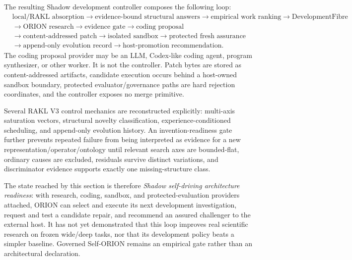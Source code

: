 The resulting Shadow development controller composes the following loop:
\[
\begin{aligned}
&\text{local/RAKL absorption}
\rightarrow \text{evidence-bound structural answers}
\rightarrow \text{empirical work ranking}
\rightarrow \text{DevelopmentFibre}\\
&\rightarrow \text{ORION research}
\rightarrow \text{evidence gate}
\rightarrow \text{coding proposal}\\
&\rightarrow \text{content-addressed patch}
\rightarrow \text{isolated sandbox}
\rightarrow \text{protected fresh assurance}\\
&\rightarrow \text{append-only evolution record}
\rightarrow \text{host-promotion recommendation}.
\end{aligned}
\]
The coding proposal provider may be an LLM, Codex-like coding agent, program synthesizer, or other worker.  It is not the controller.  Patch bytes are stored as content-addressed artifacts, candidate execution occurs behind a host-owned sandbox boundary, protected evaluator/governance paths are hard rejection coordinates, and the controller exposes no merge primitive.

Several RAKL V3 control mechanics are reconstructed explicitly: multi-axis saturation vectors, structural novelty classification, experience-conditioned scheduling, and append-only evolution history.  An invention-readiness gate further prevents repeated failure from being interpreted as evidence for a new representation/operator/ontology until relevant search axes are bounded-flat, ordinary causes are excluded, residuals survive distinct variations, and discriminator evidence supports exactly one missing-structure class.

The state reached by this section is therefore \emph{Shadow self-driving architecture readiness}: with research, coding, sandbox, and protected-evaluation providers attached, ORION can select and execute its next development investigation, request and test a candidate repair, and recommend an assured challenger to the external host.  It has not yet demonstrated that this loop improves real scientific research on frozen wide/deep tasks, nor that its development policy beats a simpler baseline.  Governed Self-ORION remains an empirical gate rather than an architectural declaration.
